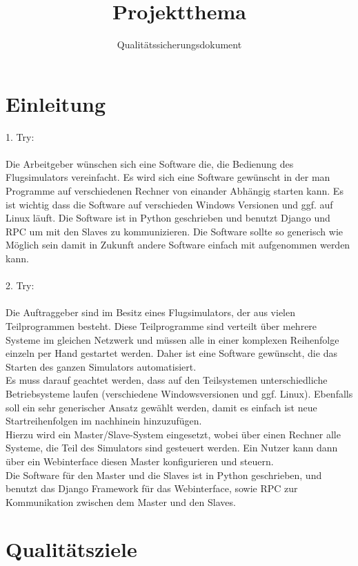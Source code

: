 \documentclass[accentcolor=tud9c,12pt,paper=a4]{tudreport}
\title{Projektthema}
\subtitle{Qualitätssicherungsdokument}
\begin{document}
	\maketitle
	\tableofcontents

	\chapter{Einleitung}
		1. Try:\\ \\	
		Die Arbeitgeber wünschen sich eine Software die, die Bedienung des
		Flugsimulators vereinfacht. Es wird sich eine Software gewünscht
		in der man Programme auf verschiedenen Rechner von einander Abhängig
		starten kann. Es ist wichtig dass die Software auf verschieden
		Windows Versionen und ggf. auf Linux läuft. Die Software ist in Python
		geschrieben und benutzt Django und RPC um mit den Slaves zu
		kommunizieren. Die Software sollte so generisch wie Möglich sein
		damit in Zukunft andere Software einfach mit aufgenommen werden kann.
		\\
		\\
		2. Try:\\ \\	
		Die Auftraggeber sind im Besitz eines Flugsimulators, der aus vielen 
		Teilprogrammen besteht. Diese Teilprogramme sind verteilt über mehrere Systeme im
		gleichen Netzwerk und müssen alle in einer komplexen Reihenfolge einzeln per Hand 
		gestartet werden. Daher ist eine Software gewünscht, die das Starten des ganzen
		Simulators automatisiert.\\[5pt]
		Es muss darauf geachtet werden, dass auf den Teilsystemen unterschiedliche 
		Betriebsysteme laufen (verschiedene Windowsversionen und ggf. Linux). Ebenfalls 
		soll ein sehr generischer Ansatz gewählt werden, damit es einfach ist neue 
		Startreihenfolgen im nachhinein hinzuzufügen.\\[5pt]
		Hierzu wird ein Master/Slave-System eingesetzt, wobei über einen Rechner alle 
		Systeme, die Teil des Simulators sind gesteuert werden. Ein Nutzer kann dann über
		ein Webinterface diesen Master konfigurieren und steuern.\\[5pt]
		Die Software für den Master und die Slaves ist in Python geschrieben, und benutzt
		das Django Framework für das Webinterface, sowie RPC zur Kommunikation zwischen 
		dem Master und den Slaves.
		

	\chapter{Qualitätsziele}
\end{document}
